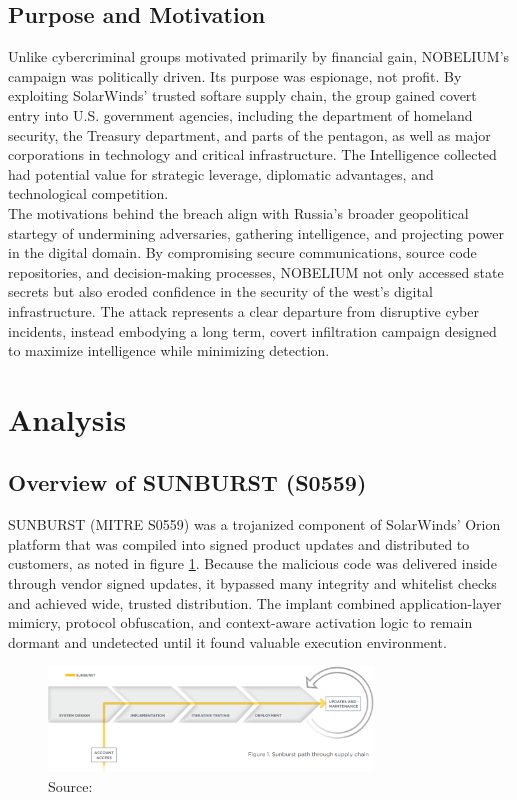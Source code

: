 \documentclass[conference]{IEEEtran}
\begin{document}
\subsection{Purpose and Motivation}
Unlike cybercriminal groups motivated primarily by financial gain\cite{CoreTech2022Motivations}, NOBELIUM's campaign was politically driven. Its purpose was espionage, not profit. By exploiting SolarWinds'
trusted softare supply chain, the group gained covert entry into U.S. government agencies, including the department of homeland security, the Treasury department, and parts of the
pentagon, as well as major corporations in technology and critical infrastructure. The Intelligence collected had potential value for strategic leverage, diplomatic advantages, and technological competition.
\\
The motivations behind the breach align with Russia's broader geopolitical startegy of undermining adversaries, gathering intelligence, and projecting power in the digital domain\cite{HakalaMelnychuk2021RussiaCyberStrategy}.
By compromising secure communications, source code repositories, and decision-making processes, NOBELIUM not only accessed state secrets but also eroded confidence in the security of the west's digital
infrastructure. The attack represents a clear departure from disruptive cyber incidents, instead embodying a long term, covert infiltration campaign designed to maximize intelligence while minimizing detection.




\section{Analysis}
\subsection{Overview of SUNBURST (S0559)}
SUNBURST (MITRE S0559) was a trojanized component of SolarWinds' Orion platform that was compiled into
signed product updates and distributed to customers, as noted in figure \ref{fig:SUNBURSTPath}. Because the malicious code was delivered inside through vendor signed updates, it bypassed many integrity and whitelist checks
and achieved wide, trusted distribution. The implant combined application-layer mimicry, protocol obfuscation, and context-aware activation logic to remain dormant and undetected
until it found valuable execution environment.
\begin{figure}[H]
    \centering
    \includegraphics[width=3.4in]{SUNBURST-path.png}
    \caption{Source: \cite{BrokenTrustHerrEtAl} }
    \label{fig:SUNBURSTPath}
\end{figure}
\end{document}
